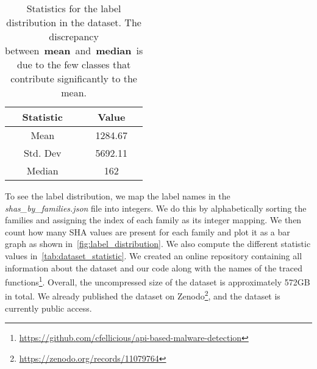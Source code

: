 \begin{table}[!ht]
    \centering
    
    \begin{tabular}{|c|c|}
         \hline
         Statistic & Value \\
         \hline
         Mean & 1284.67 \\
         Std. Dev & 5692.11 \\
         Median & 162 \\
         \hline
    \end{tabular}
    \caption{Statistics for the label distribution in the dataset. The discrepancy between~\textbf{mean}~and~\textbf{median}~is due to the few classes that contribute significantly to the mean.}
    \label{tab:dataset_statistic}
\end{table}
To see the label distribution, we map the label names in the \textit{shas\_by\_families.json} file into integers.
We do this by alphabetically sorting the families and assigning the index of each family as its integer mapping.
We then count how many SHA values are present for each family and plot it as a bar graph as shown in~\autoref{fig:label_distribution}.
We also compute the different statistic values in~\autoref{tab:dataset_statistic}.
\fi
We created an online repository containing all information about the dataset and our code along with the names of the traced functions\footnote{\url{https://github.com/cfellicious/api-based-malware-detection}}.
Overall, the uncompressed size of the dataset is approximately 572GB in total. We already published the dataset on Zenodo\footnote{\url{https://zenodo.org/records/11079764}}, and the dataset is currently public access.



\iffalse
\begin{figure}
    \centering
    \texttt{[image: figures/API\_calls\_per\_file.png]}
    \caption{Distribution of API Calls per malware sample}
    \label{fig:api_calls_per_file}
\end{figure}

We created an online repository containing all information about the dataset and our code along with the names of the traced functions\footnote{\url{https://github.com/cfellicious/api-based-malware-detection}}.
\fi
